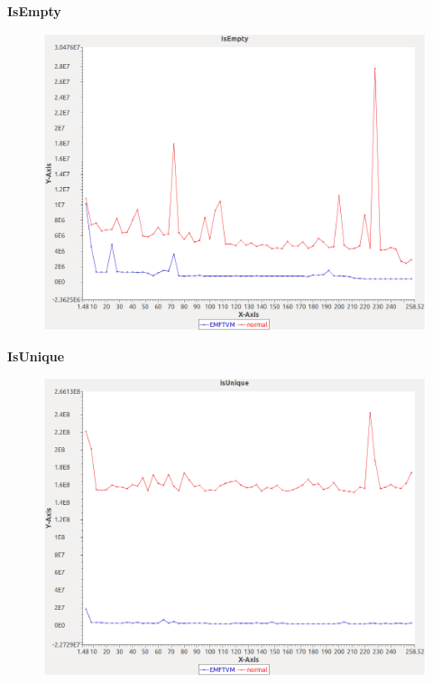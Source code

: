 \noindent\textbf{IsEmpty}

\begin{figure}[h]
\centering
\includegraphics[width=\textwidth]{graphs/orderedset/IsEmpty}
\end{figure}
\pagebreak

\noindent\textbf{IsUnique}

\begin{figure}[h]
\centering
\includegraphics[width=\textwidth]{graphs/orderedset/isUnique}
\end{figure}
\pagebreak

